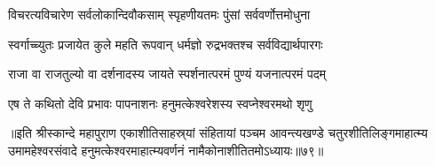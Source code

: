 \twolineshloka
{विचरत्यविचारेण सर्वलोकान्दिवौकसाम्}
{स्पृहणीयतमः पुंसां सर्ववर्णोत्तमोधुना}%

\twolineshloka
{स्वर्गाच्च्युतः प्रजायेत कुले महति रूपवान्}
{धर्मज्ञो रुद्रभक्तश्च सर्वविद्यार्थपारगः}%

\twolineshloka
{राजा वा राजतुल्यो वा दर्शनादस्य जायते}
{स्पर्शनात्परमं पुण्यं यजनात्परमं पदम्}%

\twolineshloka
{एष ते कथितो देवि प्रभावः पापनाशनः}
{हनुमत्केश्वरेशस्य स्वप्नेश्वरमथो शृणु}%

॥इति श्रीस्कान्दे महापुराण एकाशीतिसाहस्र्यां संहितायां पञ्चम आवन्त्यखण्डे चतुरशीतिलिङ्गमाहात्म्य उमामहेश्वरसंवादे हनुमत्केश्वरमाहात्म्यवर्णनं नामैकोनाशीतितमोऽध्यायः॥७९॥
